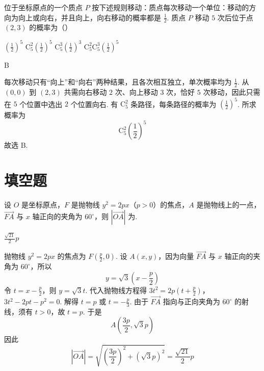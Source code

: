 \begin{problem}
位于坐标原点的一个质点 \(P\) 按下述规则移动：质点每次移动一个单位：移动的方向为向上或向右，并且向上，向右移动的概率都是 \(\frac{1}{2}\). 质点 \(P\) 移动 \(5\) 次后位于点 \((2,3)\) 的概率为（\quad）

\choices
    {\(\left(\frac{1}{2}\right)^{5}\)}
    {\(\mathrm{C}_5^2\left(\frac{1}{2}\right)^5\)}
    {\(\mathrm{C}_5^3\left(\frac{1}{2}\right)^3\)}
    {\(\mathrm{C}_5^2\mathrm{C}_5^3\left(\frac{1}{2}\right)^5\)}

\begin{answer}B\end{answer}

\begin{solution}
每次移动只有“向上”和“向右”两种结果，且各次相互独立，单次概率均为 \(\frac12\). 从 \((0,0)\) 到 \((2,3)\) 共需向右移动 \(2\) 次、向上移动 \(3\) 次，恰好 \(5\) 次移动，因此只需在 \(5\) 个位置中选出 \(2\) 个位置向右. 有 \(\mathrm C_5^2\) 条路径，每条路径的概率为 \(\left(\frac12\right)^5\). 所求概率为
\[
\mathrm C_5^2\left(\frac12\right)^5
\]
故选 B.
\end{solution}
\end{problem}

\section{填空题}

\begin{problem}
设 \(O\) 是坐标原点，\(F\) 是抛物线 \( y^{2} = 2px \)（\(p > 0\)）的焦点，\(A\) 是抛物线上的一点，\( \overrightarrow{FA} \) 与 \(x\) 轴正向的夹角为 \( 60^{\circ} \)，则 \( \left|\overrightarrow{OA}\right| \) 为\fillinblank{}.

\begin{answer}\(\frac{\sqrt{21}}{2}p\)\end{answer}

\begin{solution}
抛物线 \(y^2=2px\) 的焦点为 \(F\left(\frac{p}{2},0\right)\). 设 \(A(x,y)\)，因为向量 \(\overrightarrow{FA}\) 与 \(x\) 轴正向的夹角为 \(60^\circ\)，所以
\[
y=\sqrt{3}\left(x-\frac{p}{2}\right)
\]
令 \(t=x-\frac{p}{2}\)，则 \(y=\sqrt{3}t\). 代入抛物线方程得
\(3t^2=2p\left(t+\frac{p}{2}\right)\)，\(3t^2-2pt-p^2=0\).
解得 \(t=p\) 或 \(t=-\frac{p}{3}\). 由于 \(\overrightarrow{FA}\) 指向与正向夹角为 \(60^\circ\) 的射线，须有 \(t>0\)，故 \(t=p\). 于是
\[
A\left(\frac{3p}{2},\sqrt{3}p\right)
\]
因此
\[
|\overrightarrow{OA}|=\sqrt{\left(\frac{3p}{2}\right)^2+(\sqrt{3}p)^2}=\frac{\sqrt{21}}{2}p
\]
\end{solution}
\end{problem}

